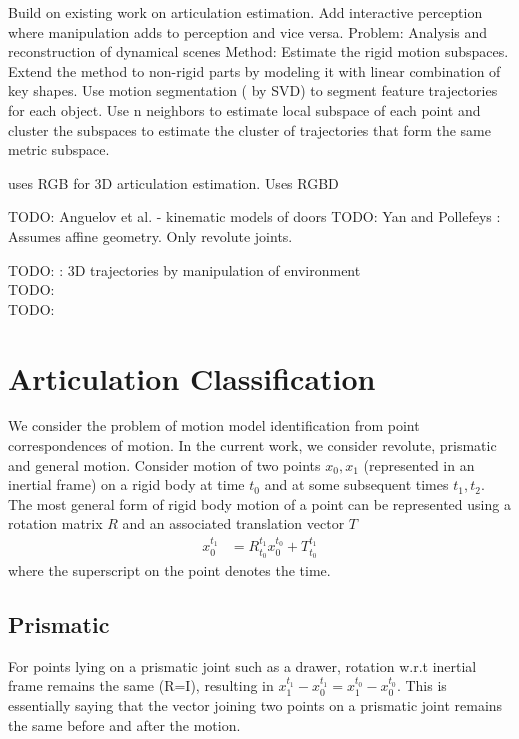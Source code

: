 \documentclass[conference]{IEEEtran}
\begin{document}
\cite{martin2014online} Build on existing work on articulation estimation. Add interactive perception where manipulation adds to perception and vice versa.
  \cite{yan2006automatic} 
    Problem: Analysis and reconstruction of dynamical scenes
    Method: Estimate the rigid motion subspaces. Extend the method to non-rigid
    parts by modeling it with linear combination of key shapes. Use motion
    segmentation ( by SVD) to segment feature trajectories for each object. Use
    n neighbors to estimate local subspace of each point and cluster the
    subspaces to estimate the cluster of trajectories that form the same metric subspace.

    \cite{katz2010interactive} uses RGB for 3D articulation estimation.
    \cite{katz2013interactive} Uses RGBD

 
TODO: Anguelov et al. - kinematic models of doors
TODO: Yan and Pollefeys : Assumes affine geometry. Only revolute joints.


TODO: \cite{sturm20103d} : 3D trajectories by manipulation of environment \\
TODO: \cite{huang2012occlusion} \\ 
TODO: \cite{Pillai-RSS-14} \\


\section{Articulation Classification}\label{sec:articulation_classification} We consider the problem of motion model identification from point correspondences of motion. In the current work, we consider revolute, prismatic and general motion. Consider motion of two points $x_0,x_1$ (represented in an inertial frame) on a rigid body at time $t_0$ and at some subsequent times $t_1,t_2$. The most general form of rigid body motion of a point can be represented using a rotation matrix $R$ and an associated translation vector $T$
\begin{align}
x_0^{t_1}& = R_{t_0}^{t_1}x_0^{t_0}+T_{t_0}^{t_1}
\end{align}
where the superscript on the point denotes the time.
\subsection{Prismatic}
For points lying on a prismatic joint such as a drawer, rotation w.r.t inertial frame remains the same (R=I), resulting in $x_1^{t_1}-x_0^{t_1} = x_1^{t_0}-x_0^{t_0}$. This is essentially saying that the vector joining two points on a prismatic joint remains the same before and after the motion.
\end{document}
